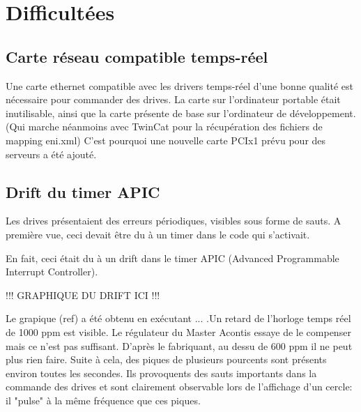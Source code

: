 \section{Difficultées}

\subsection{Carte réseau compatible temps-réel}
Une carte ethernet compatible avec les drivers temps-réel d'une bonne qualité est nécessaire pour commander des drives. La carte sur l'ordinateur portable était inutilisable, ainsi que la carte présente de base sur l'ordinateur de développement. (Qui marche néanmoins avec TwinCat pour la récupération des fichiers de mapping eni.xml) C'est pourquoi une nouvelle carte PCIx1 prévu pour des serveurs a été ajouté. 

\subsection{Drift du timer APIC}

Les drives présentaient des erreurs périodiques, visibles sous forme de sauts. A première vue, ceci devait être du à un timer dans le code qui s'activait.

\par
En fait, ceci était du à un drift dans le timer APIC (Advanced Programmable Interrupt Controller).

!!! GRAPHIQUE DU DRIFT ICI !!!

Le grapique (ref) a été obtenu en exécutant ... .Un retard de l'horloge temps réel de 1000 ppm est visible. Le régulateur du Master Acontis  essaye de le compenser mais ce n'est pas suffisant. D'après le fabriquant, au dessu de 600 ppm il ne peut plus rien faire. Suite à cela, des piques de plusieurs pourcents sont présents environ toutes les secondes. Ils provoquents des sauts importants dans la commande des drives et sont clairement observable lors de l'affichage d'un cercle: il "pulse" à la même fréquence que ces piques.